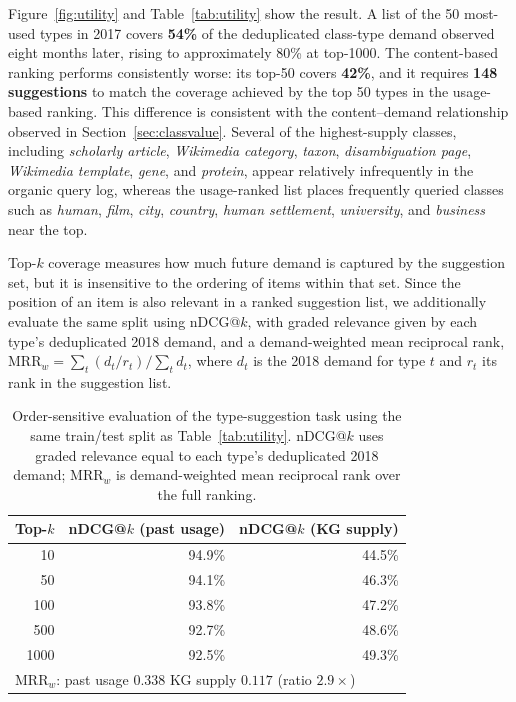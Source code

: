 \documentclass[sw]{iosart2x}
\begin{document}
Figure~\ref{fig:utility} and Table~\ref{tab:utility} show the result. A list of the 50 most-used types in 2017 covers \textbf{54\%} of the deduplicated class-type demand observed eight months later, rising to approximately 80\% at top-1000. The content-based ranking performs consistently worse: its top-50 covers \textbf{42\%}, and it requires \textbf{148 suggestions} to match the coverage achieved by the top 50 types in the usage-based ranking. This difference is consistent with the content--demand relationship observed in Section~\ref{sec:classvalue}. Several of the highest-supply classes, including \emph{scholarly article}, \emph{Wikimedia category}, \emph{taxon}, \emph{disambiguation page}, \emph{Wikimedia template}, \emph{gene}, and \emph{protein}, appear relatively infrequently in the organic query log, whereas the usage-ranked list places frequently queried classes such as \emph{human}, \emph{film}, \emph{city}, \emph{country}, \emph{human settlement}, \emph{university}, and \emph{business} near the top.

Top-$k$ coverage measures how much future demand is captured by the suggestion set, but it is insensitive to the ordering of items within that set. Since the position of an item is also relevant in a ranked suggestion list, we additionally evaluate the same split using nDCG@$k$, with graded relevance given by each type's deduplicated 2018 demand, and a demand-weighted mean reciprocal rank,
$\mathrm{MRR}_w = \sum_t (d_t / r_t) / \sum_t d_t$,
where $d_t$ is the 2018 demand for type $t$ and $r_t$ its rank in the suggestion list.

\begin{table}[ht]
\centering
\caption{Order-sensitive evaluation of the type-suggestion task using the same train/test split as Table~\ref{tab:utility}. nDCG@$k$ uses graded relevance equal to each type's deduplicated 2018 demand; $\mathrm{MRR}_w$ is demand-weighted mean reciprocal rank over the full ranking.}
\label{tab:ranking}
\begin{tabular}{r|r|r}
\hline
Top-$k$ & nDCG@$k$ (past usage) & nDCG@$k$ (KG supply) \\
\hline
10   & 94.9\% & 44.5\% \\
50   & 94.1\% & 46.3\% \\
100  & 93.8\% & 47.2\% \\
500  & 92.7\% & 48.6\% \\
1000 & 92.5\% & 49.3\% \\
\hline
\multicolumn{3}{l}{$\mathrm{MRR}_w$: past usage $0.338$ \quad KG supply $0.117$ \quad (ratio $2.9\times$)} \\
\hline
\end{tabular}
\end{table}
\end{document}
